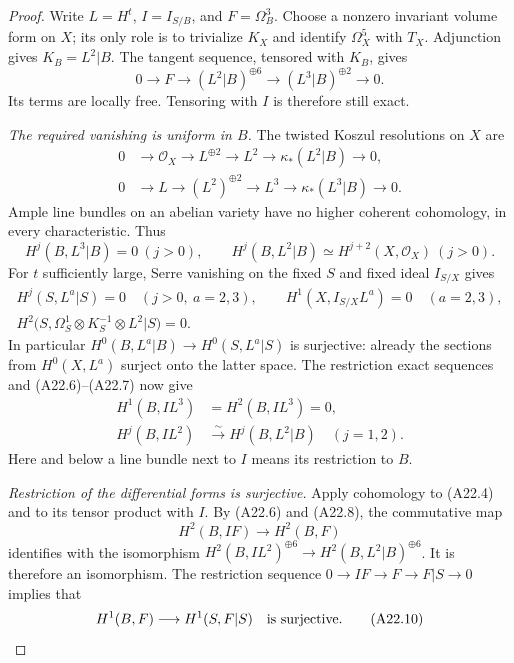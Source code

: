\documentclass[11pt]{article}
\theoremstyle{remark}\newtheorem{remark}[theorem]{Remark}
\begin{document}
\begin{proof}
Write $L=H^t$, $I=I_{S/B}$, and $F=\Omega_B^3$.
Choose a nonzero invariant volume form on $X$; its only role
is to trivialize $K_X$ and identify $\Omega_X^5$ with $T_X$.
Adjunction gives $K_B=L^2|B$. The tangent sequence, tensored
with $K_B$, gives
\[
 0\longrightarrow F\longrightarrow (L^2|B)^{\oplus6}
              \longrightarrow (L^3|B)^{\oplus2}
              \longrightarrow0.
 \tag{A22.4}
\]
Its terms are locally free. Tensoring with $I$ is therefore
still exact.

\emph{The required vanishing is uniform in $B$.}
The twisted Koszul resolutions on $X$ are
\[
 \begin{split}
 0&\longrightarrow\mathcal O_X\longrightarrow L^{\oplus2}
                   \longrightarrow L^2
                   \longrightarrow\kappa_*(L^2|B)\longrightarrow0,\\
 0&\longrightarrow L\longrightarrow (L^2)^{\oplus2}
                   \longrightarrow L^3
                   \longrightarrow\kappa_*(L^3|B)\longrightarrow0.
 \end{split}
 \tag{A22.5}
\]
Ample line bundles on an abelian variety have no higher
coherent cohomology, in every characteristic. Thus
\[
 H^j(B,L^3|B)=0\ (j>0),\qquad
 H^j(B,L^2|B)\simeq H^{j+2}(X,\mathcal O_X)\ (j>0).
 \tag{A22.6}
\]
For $t$ sufficiently large, Serre vanishing on the fixed
$S$ and fixed ideal $I_{S/X}$ gives
\[
 \begin{gathered}
 H^j(S,L^a|S)=0\quad(j>0,\ a=2,3),\qquad
 H^1(X,I_{S/X}L^a)=0\quad(a=2,3),\\
 H^2\bigl(S,\Omega_S^1\otimes K_S^{-1}\otimes L^2|S\bigr)=0.
 \end{gathered}
 \tag{A22.7}
\]
In particular $H^0(B,L^a|B)\to H^0(S,L^a|S)$ is
surjective: already the sections from $H^0(X,L^a)$
surject onto the latter space. The restriction exact
sequences and (A22.6)--(A22.7) now give
\[
 \begin{split}
 H^1(B,IL^3)&=H^2(B,IL^3)=0,\\
 H^j(B,IL^2)&\xrightarrow{\sim}H^j(B,L^2|B)
                                  \quad(j=1,2).
 \end{split}
 \tag{A22.8}
\]
Here and below a line bundle next to $I$ means its
restriction to $B$.

\emph{Restriction of the differential forms is surjective.}
Apply cohomology to (A22.4) and to its tensor product
with $I$. By (A22.6) and (A22.8), the commutative map
\[
 H^2(B,IF)\longrightarrow H^2(B,F)
 \tag{A22.9}
\]
identifies with the isomorphism
$H^2(B,IL^2)^{\oplus6}\to H^2(B,L^2|B)^{\oplus6}$.
It is therefore an isomorphism. The restriction sequence
$0\to IF\to F\to F|S\to0$ implies that
\[
                  H^1(B,F)\longrightarrow H^1(S,F|S)
                     \quad\hbox{is surjective}.
 \tag{A22.10}
\]


\end{proof}
\end{document}
